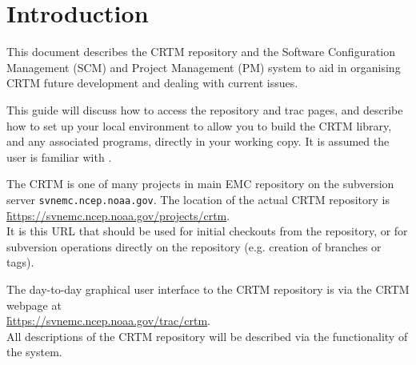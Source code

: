 \chapter{Introduction}
This document describes the CRTM \subversion{} repository and the \trac{} Software Configuration Management (SCM) and Project Management (PM) system to aid in organising CRTM future development and dealing with current issues.

This guide will discuss how to access the repository and trac pages, and describe how to set up your local environment to allow you to build the CRTM library, and any associated programs, directly in your working copy. It is assumed the user is familiar with \subversion{}.

The CRTM is one of many projects in main EMC repository on the subversion server \texttt{svnemc.ncep.noaa.gov}. The location of the actual CRTM repository is\\ \hspace*{1cm}\href{https://svnemc.ncep.noaa.gov/projects/crtm}{\f{https://svnemc.ncep.noaa.gov/projects/crtm}}.\\
It is this URL that should be used for initial checkouts from the repository, or for subversion operations directly on the repository (e.g. creation of branches or tags).
 
The day-to-day graphical user interface to the CRTM repository is via the CRTM \trac{} webpage at\\ \hspace*{1cm}\href{https://svnemc.ncep.noaa.gov/trac/crtm}{\f{https://svnemc.ncep.noaa.gov/trac/crtm}}.\\
All descriptions of the CRTM repository will be described via the functionality of the \trac{} system.

